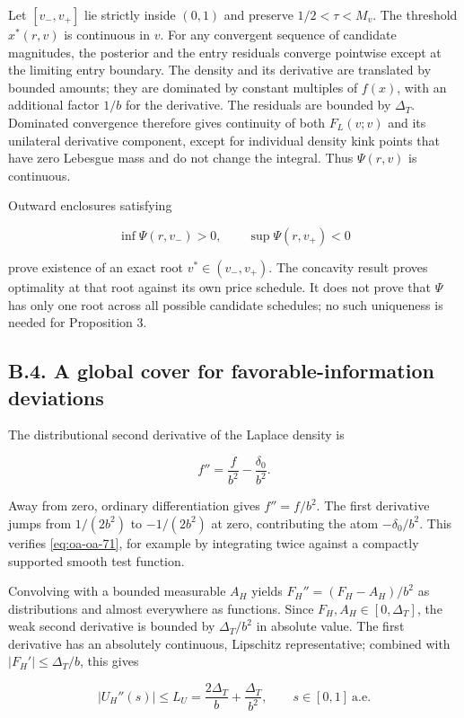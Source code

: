 \documentclass[
  11pt,
]{article}
\begin{document}
Let \([v_-,v_+]\) lie strictly inside \((0,1)\) and preserve
\(1/2<\tau<M_v\). The threshold \(x^*(r,v)\) is continuous in \(v\). For
any convergent sequence of candidate magnitudes, the posterior and the
entry residuals converge pointwise except at the limiting entry
boundary. The density and its derivative are translated by bounded
amounts; they are dominated by constant multiples of \(f(x)\), with an
additional factor \(1/b\) for the derivative. The residuals are bounded
by \(\Delta_T\). Dominated convergence therefore gives continuity of
both \(F_L(v;v)\) and its unilateral derivative component, except for
individual density kink points that have zero Lebesgue mass and do not
change the integral. Thus \(\Psi(r,v)\) is continuous.

Outward enclosures satisfying

\[
\inf\Psi(r,v_-)>0,\qquad \sup\Psi(r,v_+)<0
\tag{OA.70}\label{eq:oa-oa-70}
\]

prove existence of an exact root \(v^*\in(v_-,v_+)\). The concavity
result proves optimality at that root against its own price schedule. It
does not prove that \(\Psi\) has only one root across all possible
candidate schedules; no such uniqueness is needed for Proposition 3.

\subsection{B.4. A global cover for favorable-information
deviations}\label{oa-b-cover}

The distributional second derivative of the Laplace density is

\[
f''=\frac{f}{b^2}-\frac{\delta_0}{b^2}.
\tag{OA.71}\label{eq:oa-oa-71}
\]

Away from zero, ordinary differentiation gives \(f''=f/b^2\). The first
derivative jumps from \(1/(2b^2)\) to \(-1/(2b^2)\) at zero,
contributing the atom \(-\delta_0/b^2\). This verifies
\eqref{eq:oa-oa-71}, for example by integrating twice against a
compactly supported smooth test function.

Convolving with a bounded measurable \(A_H\) yields
\(F_H''=(F_H-A_H)/b^2\) as distributions and almost everywhere as
functions. Since \(F_H,A_H\in[0,\Delta_T]\), the weak second derivative
is bounded by \(\Delta_T/b^2\) in absolute value. The first derivative
has an absolutely continuous, Lipschitz representative; combined with
\(|F_H'|\le\Delta_T/b\), this gives

\[
|U_H''(s)|\le L_U=\frac{2\Delta_T}{b}+\frac{\Delta_T}{b^2},\qquad s\in[0,1]\ \text{a.e.}
\tag{OA.72}\label{eq:oa-oa-72}
\]
\end{document}
